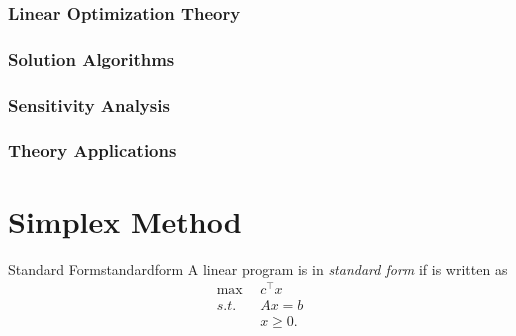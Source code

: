 \documentclass[letter,12pt]{book}
\renewcommand{\0}{\mathbf{0}}
\begin{document}
\subsection{Linear Optimization Theory} 


\subsection{Solution Algorithms}  


\subsection{Sensitivity Analysis} 


\subsection{Theory Applications} 


%
%
%
%
%
%
%
%
%

%
%
%
%
%
%
%
%
%


\fi

\chapter{Simplex Method}


\begin{definition}{Standard Form}{standardform}
A linear program is in \emph{standard form} if is written as 
\begin{align*}
\max \ \ &c^\top x \\
s.t. \ \ & Ax = b\\
& x \geq 0.
\end{align*}
\end{definition}
\end{document}
